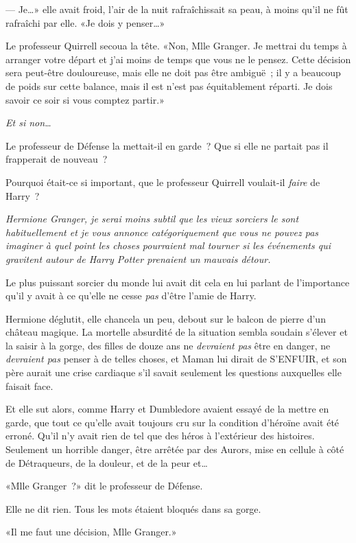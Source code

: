 --- Je…» elle avait froid, l'air de la nuit rafraîchissait sa peau, à moins qu'il ne fût rafraîchi par elle. «Je dois y penser…»

Le professeur Quirrell secoua la tête. «Non, Mlle Granger. Je mettrai du temps à arranger votre départ et j'ai moins de temps que vous ne le pensez. Cette décision sera peut-être douloureuse, mais elle ne doit pas être ambiguë~; il y a beaucoup de poids sur cette balance, mais il est n'est pas équitablement réparti. Je dois savoir ce soir si vous comptez partir.»

\emph{Et si non…}

Le professeur de Défense la mettait-il en garde~? Que si elle ne partait pas il frapperait de nouveau~?

Pourquoi était-ce si important, que le professeur Quirrell voulait-il \emph{faire} de Harry~?

\emph{Hermione Granger, je serai moins subtil que les vieux sorciers le sont habituellement et je vous annonce catégoriquement que vous ne pouvez pas imaginer à quel point les choses pourraient mal tourner si les événements qui gravitent autour de Harry Potter prenaient un mauvais détour.}

Le plus puissant sorcier du monde lui avait dit cela en lui parlant de l'importance qu'il y avait à ce qu'elle ne cesse \emph{pas} d'être l'amie de Harry.

Hermione déglutit, elle chancela un peu, debout sur le balcon de pierre d'un château magique. La mortelle absurdité de la situation sembla soudain s'élever et la saisir à la gorge, des filles de douze ans ne \emph{devraient pas} être en danger, ne \emph{devraient pas} penser à de telles choses, et Maman lui dirait de S'ENFUIR, et son père aurait une crise cardiaque s'il savait seulement les questions auxquelles elle faisait face.

Et elle sut alors, comme Harry et Dumbledore avaient essayé de la mettre en garde, que tout ce qu'elle avait toujours cru sur la condition d'héroïne avait été erroné. Qu'il n'y avait rien de tel que des héros à l'extérieur des histoires. Seulement un horrible danger, être arrêtée par des Aurors, mise en cellule à côté de Détraqueurs, de la douleur, et de la peur et…

«Mlle Granger~?» dit le professeur de Défense.

Elle ne dit rien. Tous les mots étaient bloqués dans sa gorge.

«Il me faut une décision, Mlle Granger.»

